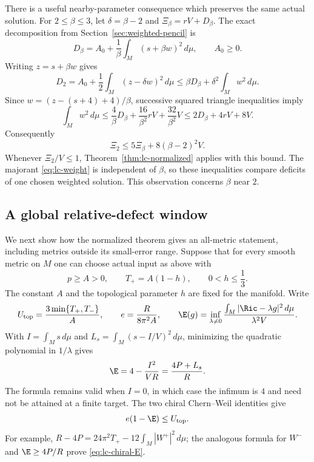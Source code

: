 There is a useful nearby-parameter consequence which preserves the
same actual solution.  For $2\le\beta\le3$, let
$\delta=\beta-2$ and $\Xi_\beta=rV+D_\beta$.  The exact decomposition
from Section~\ref{sec:weighted-pencil} is
\[
 D_\beta=A_0+\frac1\beta\int_M(s+\beta w)^2\,d\mu,
 \qquad A_0\ge0.
\]
Writing $z=s+\beta w$ gives
\[
 D_2=A_0+\frac12\int_M(z-\delta w)^2\,d\mu
       \le\beta D_\beta+\delta^2\int_Mw^2\,d\mu.
\]
Since $w=(z-(s+4)+4)/\beta$, successive squared triangle
inequalities imply
\[
 \int_Mw^2\,d\mu
 \le\frac4\beta D_\beta+\frac{16}{\beta^2}rV
                         +\frac{32}{\beta^2}V
 \le2D_\beta+4rV+8V.
\]
Consequently
\begin{equation}\label{eq:lc-nearby-pencil}
 \Xi_2\le5\Xi_\beta+8(\beta-2)^2V.
\end{equation}
Whenever $\Xi_2/V\le1$, Theorem~\ref{thm:lc-normalized} applies
with this bound.  The majorant \eqref{eq:lc-weight} is independent
of $\beta$, so these inequalities compare deficits of one chosen
weighted solution.  This observation concerns $\beta$ near $2$.

\subsection{A global relative-defect window}

We next show how the normalized theorem gives an all-metric statement,
including metrics outside its small-error range.  Suppose that for
every smooth metric on $M$ one can choose actual input as above with
\begin{equation}\label{eq:lc-all-metric-input}
 p\ge A>0,\qquad T_+=A(1-h),\qquad 0<h\le\frac13.
\end{equation}
The constant $A$ and the topological parameter $h$ are fixed for the
manifold.  Write
\begin{equation}\label{eq:lc-global-notation}
 U_{\mathrm{top}}=\frac{3\min\{T_+,T_-\}}A,\qquad
 e=\frac{R}{8\pi^2A},\qquad
 \E(g)=\inf_{\lambda\ne0}
       \frac{\int_M|\Ric-\lambda g|^2\,d\mu}{\lambda^2V}.
\end{equation}
With $I=\int_Ms\,d\mu$ and
$L_s=\int_M(s-I/V)^2\,d\mu$, minimizing the quadratic polynomial in
$1/\lambda$ gives
\begin{equation}\label{eq:lc-E-formula}
 \E=4-\frac{I^2}{VR}=\frac{4P+L_s}{R}.
\end{equation}
The formula remains valid when $I=0$, in which case the infimum is
$4$ and need not be attained at a finite target.  The two chiral
Chern--Weil identities give
\begin{equation}\label{eq:lc-chiral-E}
 e(1-\E)\le U_{\mathrm{top}}.
\end{equation}
For example,
$R-4P=24\pi^2T_+-12\int_M|W^+|^2\,d\mu$; the analogous formula
for $W^-$ and $\E\ge4P/R$ prove \eqref{eq:lc-chiral-E}.

